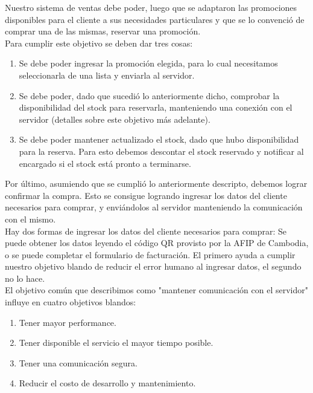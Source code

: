 \indent Nuestro sistema de ventas debe poder, luego que se adaptaron las promociones disponibles para el cliente a sus necesidades particulares y que se lo convenció de comprar una de las mismas, reservar una promoción.\\
\indent Para cumplir este objetivo se deben dar tres cosas: 
\begin{enumerate}
	\item Se debe poder ingresar la promoción elegida, para lo cual necesitamos seleccionarla de una lista y enviarla al servidor.
	\item Se debe poder, dado que sucedió lo anteriormente dicho, comprobar la disponibilidad del stock para reservarla, manteniendo una conexión con el servidor (detalles sobre este objetivo más adelante).
	\item Se debe poder mantener actualizado el stock, dado que hubo disponibilidad para la reserva. Para esto debemos descontar el stock reservado y notificar al encargado si el stock está pronto a terminarse.
\end{enumerate}

\indent Por último, asumiendo que se cumplió lo anteriormente descripto, debemos lograr confirmar la compra. Esto se consigue logrando ingresar los datos del cliente necesarios para comprar, y enviándolos al servidor manteniendo la comunicación con el mismo.\\
\indent Hay dos formas de ingresar los datos del cliente necesarios para comprar: Se puede obtener los datos leyendo el código QR provisto por la AFIP de Cambodia, o se puede completar el formulario de facturación. El primero ayuda a cumplir nuestro objetivo blando de reducir el error humano al ingresar datos, el segundo no lo hace.\\

\indent El objetivo común que describimos como "mantener comunicación con el servidor" influye en cuatro objetivos blandos:
\begin{enumerate}
	\item Tener mayor performance.
	\item Tener disponible el servicio el mayor tiempo posible.
	\item Tener una comunicación segura.
	\item Reducir el costo de desarrollo y mantenimiento.
\end{enumerate}


